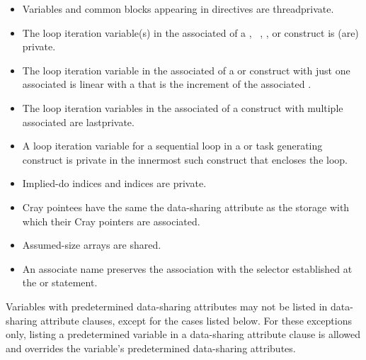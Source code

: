 \begin{fortranspecific}
\begin{itemize}
\item Variables and common blocks appearing in  directives are
threadprivate.

\item The loop iteration variable(s) in the associated  of a
  , ~,
, or  construct is (are) private.

\item The loop iteration variable in the associated  of a
   or   construct with just
one associated  is linear with a  that is the increment of
the associated .

\item The loop iteration variables in the associated  of a  construct with
multiple associated  are lastprivate.

\item A loop iteration variable for a sequential loop in a  or task generating construct is
private in the innermost such construct that encloses the loop.

\item Implied-do indices and  indices are private.

\item Cray pointees have the same the data-sharing attribute as the storage with which their Cray
pointers are associated.

\item Assumed-size arrays are shared.
\nopagebreak
\item An associate name preserves the association with the selector established at the
 or  statement.
\end{itemize}
\end{fortranspecific}
%
Variables with predetermined data-sharing attributes may not be listed in data-sharing
attribute clauses, except for the cases listed below. For these exceptions only, listing a
predetermined variable in a data-sharing attribute clause is allowed and overrides the
variable's predetermined data-sharing attributes.
%
